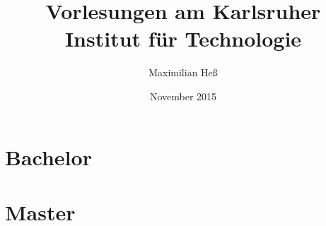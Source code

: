 \documentclass[a4paper,8pt,titlepage]{scrbook}
\title{Vorlesungen am Karlsruher Institut für Technologie}
\author{Maximilian Heß}
\date{November 2015}
\begin{document}
\maketitle
\tableofcontents

\part{Bachelor}










\part{Master}

\end{document}
